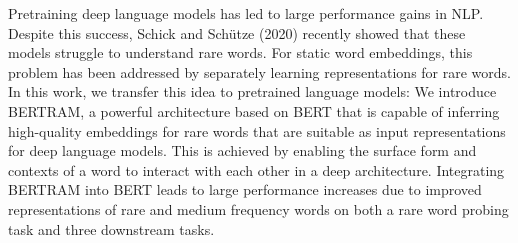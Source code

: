 Pretraining deep language models has led to large performance gains in NLP. Despite this success, Schick and Schütze (2020) recently showed that these models struggle to understand rare words. For static word embeddings, this problem has been addressed by separately learning representations for rare words. In this work, we transfer this idea to pretrained language models: We introduce BERTRAM, a powerful architecture based on BERT that is capable of inferring high-quality embeddings for rare words that are suitable as input representations for deep language models. This is achieved by enabling the surface form and contexts of a word to interact with each other in a deep architecture. Integrating BERTRAM into BERT leads to large performance increases due to improved representations of rare and medium frequency words on both a rare word probing task and three downstream tasks.
